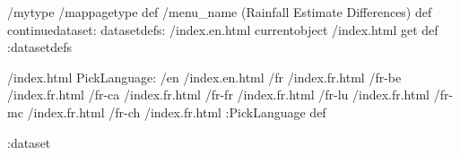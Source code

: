 \begin{ingrid}
/mytype /mappagetype def
/menu_name (Rainfall Estimate Differences) def
continuedataset:
datasetdefs:
/index.en.html currentobject /index.html get def
:datasetdefs

/index.html {
PickLanguage:
/en /index.en.html
/fr /index.fr.html
/fr-be /index.fr.html
/fr-ca /index.fr.html
/fr-fr /index.fr.html
/fr-lu /index.fr.html
/fr-mc /index.fr.html
/fr-ch /index.fr.html
:PickLanguage
} def

:dataset
\end{ingrid}
